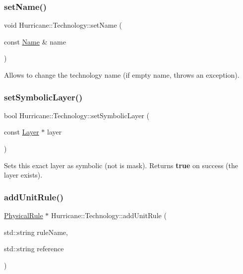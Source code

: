 \subsubsection{\texorpdfstring{set\+Name()}{setName()}}
{\footnotesize\ttfamily void Hurricane\+::\+Technology\+::set\+Name (\begin{DoxyParamCaption}\item[{const \mbox{\hyperlink{classHurricane_1_1Name}{Name}} \&}]{name }\end{DoxyParamCaption})}

Allows to change the technology name (if empty name, throws an exception). \mbox{\label{classHurricane_1_1Technology_a26c12c5828acaeb33068a2899df1134b}} 
\subsubsection{\texorpdfstring{set\+Symbolic\+Layer()}{setSymbolicLayer()}}
{\footnotesize\ttfamily bool Hurricane\+::\+Technology\+::set\+Symbolic\+Layer (\begin{DoxyParamCaption}\item[{const \mbox{\hyperlink{classHurricane_1_1Layer}{Layer}} $\ast$}]{layer }\end{DoxyParamCaption})}

Sets this exact {\ttfamily layer} as symbolic (not is mask). Returns {\bfseries true} on success (the layer exists). \mbox{\label{classHurricane_1_1Technology_a96d62a8b3eb12560a9cb778328f8a301}} 
\subsubsection{\texorpdfstring{add\+Unit\+Rule()}{addUnitRule()}}
{\footnotesize\ttfamily \mbox{\hyperlink{classHurricane_1_1PhysicalRule}{Physical\+Rule}} $\ast$ Hurricane\+::\+Technology\+::add\+Unit\+Rule (\begin{DoxyParamCaption}\item[{std\+::string}]{rule\+Name,  }\item[{std\+::string}]{reference }\end{DoxyParamCaption})}


